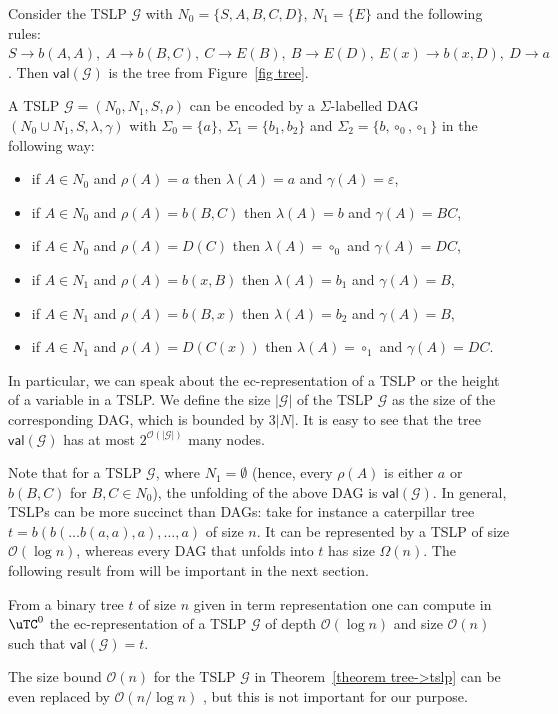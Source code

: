 \documentclass[a4paper,UKenglish,cleveref, autoref, thm-restate, numberwithinsect]{lipics-v2021}
\newcommand{\val}{\mathsf{val}}
\begin{document}
\begin{example}
Consider the TSLP $\mathcal{G}$  with $N_0 = \{S, A, B, C, D\}$, $N_1 = \{ E \}$ and the following rules:
$S \to b(A,A), \ A \to b(B,C), \ C \to E(B), \ B \to E(D), \ E(x) \to b(x,D), \ D \to a$.
Then $\val(\mathcal{G})$ is the tree from Figure~\ref{fig tree}.
\end{example}
A TSLP $\mathcal{G} = (N_0, N_1, S, \rho)$ can be encoded by a $\Sigma$-labelled DAG $(N_0 \cup N_1, S, \lambda, \gamma)$
with $\Sigma_0 = \{ a\}$, $\Sigma_1 = \{b_1, b_2 \}$ and $\Sigma_2 = \{ b, \circ_0, \circ_1 \}$ 
 in the following way:
\begin{itemize}
\item if $A \in N_0$ and $\rho(A)=a$ then $\lambda(A) = a$ and $\gamma(A) = \varepsilon$,
\item if $A \in N_0$ and $\rho(A)=b(B,C)$ then $\lambda(A) = b$ and $\gamma(A) = BC$,
\item if $A \in N_0$ and $\rho(A)=D(C)$ then $\lambda(A) = \circ_0$ and $\gamma(A) = DC$, 
\item if $A \in N_1$ and $\rho(A)=b(x,B)$ then $\lambda(A) = b_1$ and $\gamma(A) = B$,
\item if $A \in N_1$ and $\rho(A)=b(B,x)$ then $\lambda(A) = b_2$ and $\gamma(A) = B$,
\item if $A \in N_1$ and $\rho(A)=D(C(x))$ then $\lambda(A) = \circ_1$ and $\gamma(A) = DC$.   
\end{itemize}
In particular, we can speak about the ec-representation of a TSLP or the height of a variable in a TSLP.
We define the size $|\mathcal{G}|$ of the TSLP $\mathcal{G}$ as the size of the corresponding DAG, which is bounded
by $3 |N|$. It is easy to see that the tree $\val(\mathcal{G})$ has at most $2^{\mathcal{O}(|\mathcal{G}|)}$ many nodes.


Note that for a TSLP $\mathcal{G}$, where $N_1 = \emptyset$ (hence, every $\rho(A)$ is either $a$ or $b(B,C)$ for $B,C \in N_0$),
the unfolding of the above DAG is $\val(\mathcal{G})$. In general, TSLPs can be more succinct than DAGs: take for instance a caterpillar tree
$t = b(b(\ldots b(a,a),a), \ldots, a)$ of size $n$. It can be represented by a TSLP of size $\mathcal{O}(\log n)$, whereas every DAG that unfolds into $t$ has size $\Omega(n)$.
The following result from  \cite{GanardiL19} will be important in the next section.

\begin{theorem} \label{theorem tree->tslp}
From a binary tree $t$ of size $n$ given in term representation one can compute in $\uTC^0$ 
the ec-representation of a TSLP 
$\mathcal{G}$ of depth $\mathcal{O}(\log n)$ and size $\mathcal{O}(n)$ such that $\val(\mathcal{G}) = t$.
\end{theorem}
The size bound $\mathcal{O}(n)$ for the TSLP $\mathcal{G}$ in Theorem~\ref{theorem tree->tslp} can be even replaced by $\mathcal{O}(n/\log n)$ \cite[Theorem~5.6]{GanardiL19}, but this is not important for our purpose.
\end{document}
